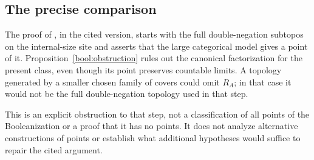 \subsection{The precise comparison}

The proof of \cite[Theorem~4.1]{Espindola2023Spectra}, in the cited
version, starts with the full double-negation subtopos on the
internal-size site and asserts that the large categorical model gives
a point of it. Proposition~\ref{bool:obstruction} rules out the
canonical factorization for the present class, even though its point
preserves countable limits. A topology generated by a smaller chosen
family of covers could omit \(R_A\); in that case it would not be
the full double-negation topology used in that step.

This is an explicit obstruction to that step, not a classification of
all points of the Booleanization or a proof that it has no points.
It does not analyze alternative constructions of points or establish
what additional hypotheses would suffice to repair the cited argument.
